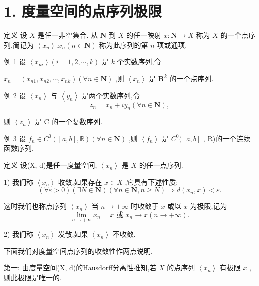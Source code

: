 \section*{1. 度量空间的点序列极限}

定义 设 $X$ 是任一非空集合. 从 $\mathbf{N}$ 到 $X$ 的任一映射 $x : \mathbf{N} \rightarrow  X$ 称为 $X$ 的一个点序列,简记为 $\left\langle  {x}_{n}\right\rangle  .{x}_{n}\left( {n \in  \mathbf{N}}\right)$ 称为此序列的第 $n$ 项或通项.

例 1 设 $\left\langle  {x}_{ni}\right\rangle  \left( {i = 1,2,\cdots ,k}\right)$ 是 $k$ 个实数序列,令

${x}_{n} = \left( {{x}_{n1},{x}_{n2},\cdots ,{x}_{nk}}\right) \left( {\forall n \in  \mathbf{N}}\right)$ ,则 $\left\langle  {x}_{n}\right\rangle$ 是 ${\mathbf{R}}^{k}$ 的一个点序列.

例 2 设 $\left\langle  {x}_{n}\right\rangle$ 与 $\left\langle  {y}_{n}\right\rangle$ 是两个实数序列,令
$${z}_{n} = {x}_{n} + i{y}_{n}\left( {\forall n \in  \mathbf{N}}\right) ,$$

则 $\left\langle  {z}_{n}\right\rangle$ 是 $\mathrm{C}$ 的一个复数序列.

例 3 设 ${f}_{n} \in  {C}^{0}\left( {\left\lbrack  {a,b}\right\rbrack  ,\mathbb{R}}\right) \left( {\forall n \in  \mathbf{N}}\right)$ ,则 $\left\langle  {f}_{n}\right\rangle$ 是 ${C}^{0}(\left\lbrack  {a,b}\right\rbrack$ , R)的一个连续函数序列.

定义 设(X, d)是任一度量空间, $\left\langle  {x}_{n}\right\rangle$ 是 $X$ 的任一点序列.

1) 我们称 $\left\langle  {x}_{n}\right\rangle$ 收敛,如果存在 $x \in  X$ ,它具有下述性质:
$$\left( {\forall \varepsilon  > 0}\right) \left( {\exists N \in  \mathbf{N}}\right) \left( {\forall n \in  \mathbf{N},n \geq  N}\right)  \Rightarrow  d\left( {{x}_{n},x}\right)  < \varepsilon .$$

这时我们也称点序列 $\left\langle  {x}_{n}\right\rangle$ 当 $n \rightarrow   + \infty$ 时收敛于 $x$ 或以 $x$ 为极限,记为
$$\mathop{\lim }\limits_{{n \rightarrow   + \infty }}{x}_{n} = x\text{ 或 }{x}_{n} \rightarrow  x\left( {n \rightarrow   + \infty }\right) .$$

2) 我们称 $\left\langle  {x}_{n}\right\rangle$ 发散,如果 $\left\langle  {x}_{n}\right\rangle$ 不收敛.

下面我们对度量空间点序列的收敛性作两点说明.

第一: 由度量空间(X, d)的Hausdorff分离性推知,若 $X$ 的点序列 $\left\langle  {x}_{n}\right\rangle$ 有极限 $x$ ,则此极限是唯一的.

